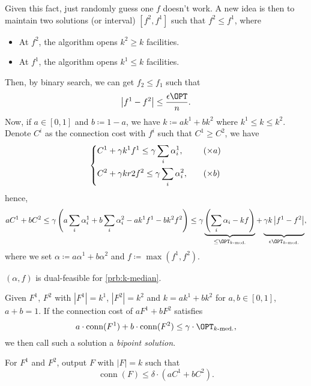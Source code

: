Given this fact, just randomly guess one \(f\) doesn't work. A new idea is then to maintain two solutions (or interval) \([f^2, f^1]\) such that \(f^2 \leq f^1\), where
\begin{itemize}
	\item At \(f^2\), the algorithm opens \(k^2 \geq k\) facilities.
	\item At \(f^1\), the algorithm opens \(k^1 \leq k\) facilities.
\end{itemize}
Then, by binary search, we can get \(f_2 \leq f_1\) such that
\[
	\left\vert f^1 - f^2 \right\vert \leq \frac{\epsilon \OPT}{n}.
\]
Now, if \(a\in [0, 1]\) and \(b \coloneqq 1 - a\), we have \(k \coloneqq ak^1 + bk^2\) where \(k^1 \leq k \leq k^2\). Denote \(C^i\) as the connection cost with \(f^i\) such that \(C^1 \geq C^2\), we have
\[
	\begin{dcases}
		C^1 + \gamma k^1 f^1 \leq \gamma \sum_{i} \alpha _i^1, & \quad (\times a) \\
		C^2 + \gamma kr2 f^2 \leq \gamma \sum_{i} \alpha _i^2, & \quad (\times b)
	\end{dcases}
\]
hence,
\[
	aC^1 + bC^2
	\leq \gamma \left( a \sum_{i} \alpha _i^1 + b \sum_{i} \alpha _i^2 - ak^1 f^1 - bk^2 f^2 \right)
	\leq \gamma \underbrace{\left( \sum_{i} \alpha _i - kf \right)}_{\leq \OPT_{\text{\(k\)-med.}}} + \underbrace{\vphantom{\left( \sum_{i} \alpha _i - kf \right)}\gamma k \left\vert f^1 - f^2 \right\vert}_{\epsilon \OPT_{\text{\(k\)-med.}}},
\]
where we set \(\alpha \coloneqq a \alpha ^1 + b \alpha ^2\) and \(f \coloneqq \max (f^1, f^2)\).

\begin{note}
	\((\alpha , f)\) is dual-feasible for \autoref{prb:k-median}.
\end{note}

\begin{definition}\label{def:bipoint-solution}
	Given \(F^1\), \(F^2\) with \(\left\vert F^1 \right\vert = k^1\), \(\left\vert F^2 \right\vert = k^2\) and \(k=ak^1 + bk^2\) for \(a, b\in [0, 1]\), \(a + b = 1\). If the connection cost of \(aF^1 + b F^2\) satisfies
	\[
		a\cdot \mathop{\mathrm{conn}}(F^1) + b\cdot \mathop{\mathrm{conn}}(F^2) \leq \gamma \cdot \OPT_{\text{\(k\)-med.}},
	\]
	we then call such a solution a \emph{bipoint solution}.
\end{definition}

\begin{remark}
	For \(F^1\) and \(F^2\), output \(F\) with \(\left\vert F \right\vert = k\) such that
	\[
		\mathop{\mathrm{conn}}(F) \leq \delta \cdot (a C^1 + b C^2).
	\]
\end{remark}

